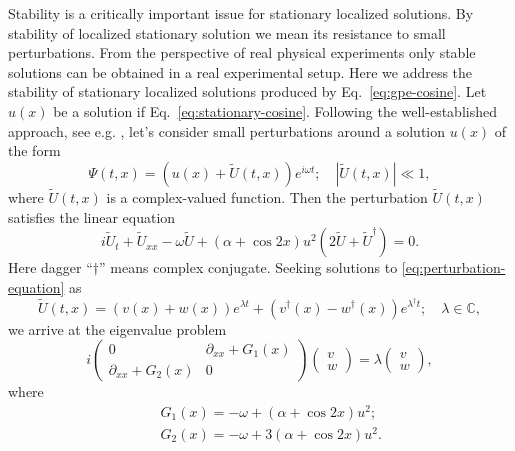 Stability is a critically important issue for stationary localized solutions.
By stability of localized stationary solution we mean its resistance to small perturbations.
From the perspective of real physical experiments only stable solutions can be obtained in a real experimental setup.
Here we address the stability of stationary localized solutions produced by Eq.~\eqref{eq:gpe-cosine}.
Let $u(x)$ be a solution if Eq.~\eqref{eq:stationary-cosine}.
Following the well-established approach, see e.g. \cite{JiankeYang}, let's consider small perturbations around a solution $u(x)$ of the form
\begin{equation}
	\Psi(t, x) = \left( u(x) + \widetilde{U}(t, x) \right) e^{i \omega t}; \quad |\widetilde{U}(t, x)| \ll 1,
\label{eq:perturbation}
\end{equation}
where $\widetilde{U}(t, x)$ is a complex-valued function.
Then the perturbation $\widetilde{U}(t, x)$ satisfies the linear equation
\begin{equation}
	i \widetilde{U}_t + \widetilde{U}_{xx} - \omega \widetilde{U} + (\alpha + \cos 2x) u^2 (2 \widetilde{U} + \widetilde{U}^\dagger) = 0.
\label{eq:perturbation-equation}
\end{equation}
Here dagger ``$\dagger$'' means complex conjugate.
Seeking solutions to \eqref{eq:perturbation-equation} as
\begin{equation}
	\widetilde{U}(t, x) = (v(x) + w(x)) e^{\lambda t} + (v^{\dagger}(x) - w^{\dagger}(x)) e^{\lambda^{\dagger} t}; \quad \lambda \in \mathbb{C},
\end{equation}
we arrive at the eigenvalue problem
\begin{equation}
	i
	\begin{pmatrix}
		0 & \partial_{xx} + G_1(x) \\
		\partial_{xx} + G_2(x) & 0
	\end{pmatrix}
	\begin{pmatrix}
		v \\
		w
	\end{pmatrix}
	= \lambda 
	\begin{pmatrix}
		v \\
		w
	\end{pmatrix},
\label{eq:eigenvalue-problem}
\end{equation}
where
\begin{eqnarray*}
	&& G_1(x) = -\omega + (\alpha + \cos 2x) u^2; \\
	&& G_2(x) = -\omega + 3 (\alpha + \cos 2x) u^2.
\end{eqnarray*}

